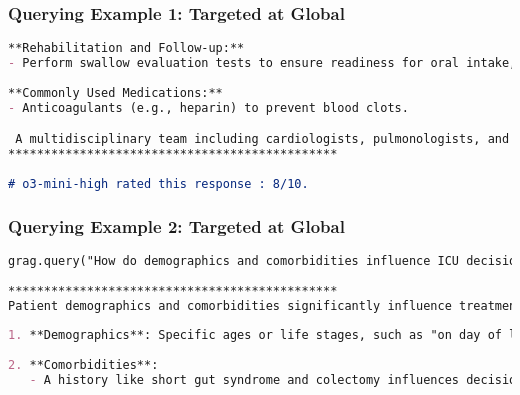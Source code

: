 \begin{frame}[fragile]\frametitle{Querying Example 1: Targeted at Global}
    \begin{lstlisting}[language=markdown]
**Rehabilitation and Follow-up:**
- Perform swallow evaluation tests to ensure readiness for oral intake, followed by a diet progression to soft or clear liquids if necessary.
 
**Commonly Used Medications:**
- Anticoagulants (e.g., heparin) to prevent blood clots.

 A multidisciplinary team including cardiologists, pulmonologists, and other specialists is often involved to address any comorbid conditions.
**********************************************
 
# o3-mini-high rated this response : 8/10.	
    \end{lstlisting}

\end{frame}

\begin{frame}[fragile]\frametitle{Querying Example 2: Targeted at Global}
    \begin{lstlisting}[language=markdown]
    grag.query("How do demographics and comorbidities influence ICU decisions?").response
	
**********************************************
Patient demographics and comorbidities significantly influence treatment decisions in the ICU, as evidenced by detailed hospital courses described in various scenarios.
 
1. **Demographics**: Specific ages or life stages, such as "on day of life 45" for a patient with unique medical conditions (metabolic issues), indicate tailored care plans sensitive to developmental stages.
 
2. **Comorbidities**:
   - A history like short gut syndrome and colectomy influences decisions about when and how to restart total parenteral nutrition (TPN). \ldots .	
    \end{lstlisting}

\end{frame}

